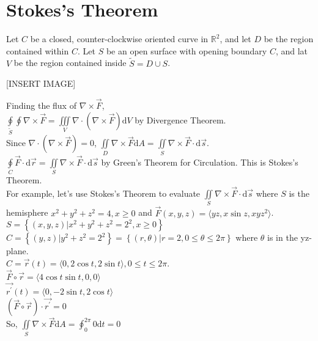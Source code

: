 \section{Stokes's Theorem}
\noindent
Let $C$ be a closed, counter-clockwise oriented curve in $\mathbb{R}^2$, and let $D$ be the region contained within $C$. Let $S$ be an open surface with opening boundary $C$, and lat $V$ be the region contained inside $\tilde{S}=D\cup S$.

[INSERT IMAGE]

\noindent
Finding the flux of $\nabla\times\vec{F}$,\\
$\oint\limits_{\tilde{S}}\oint{\nabla\times\vec{F}}=\iiint\limits_{V}{\nabla\cdot(\nabla\times\vec{F})\mathrm{d}V}$ by Divergence Theorem.\\
Since $\nabla\cdot(\nabla\times\vec{F})=0$, $\iint\limits_{D}{\nabla\times\vec{F}\mathrm{d}A}=\iint\limits_{S}{\nabla\times\vec{F}\cdot\mathrm{d}\vec{s}}$.\\
$\oint\limits_{C}{\vec{F}\cdot\mathrm{d}\vec{r}}=\iint\limits_{S}{\nabla\times\vec{F}\cdot\mathrm{d}\vec{s}}$ by Green's Theorem for Circulation. This is Stokes's Theorem.\\

\noindent
For example, let's use Stokes's Theorem to evaluate $\iint\limits_{S}{\nabla\times\vec{F}\cdot\mathrm{d}\vec{s}}$ where $S$ is the hemisphere $x^2+y^2+z^2=4, x\geq 0$ and $\vec{F}(x,y,z)=\langle yz, x\sin{z}, xyz^2\rangle$.\\
\indent
$S=\left\{(x,y,z)|x^2+y^2+z^2=2^2,x\geq 0\right\}$\\
\indent
$C=\left\{(y,z)|y^2+z^2=2^2\right\}=\left\{(r,\theta)|r=2,0\leq\theta\leq 2\pi\right\}$ where $\theta$ is in the yz-plane.\\
\indent
$C=\vec{r}(t)=\langle 0, 2\cos{t}, 2\sin{t}\rangle, 0\leq t\leq 2\pi$.\\
\indent
$\vec{F}\circ\vec{r}=\langle 4\cos{t}\sin{t}, 0, 0\rangle$\\
\indent
$\vec{r^\prime}(t)=\langle 0, -2\sin{t}, 2\cos{t}\rangle$\\
\indent
$\left(\vec{F}\circ\vec{r}\right)\cdot\vec{r^\prime}=0$\\
\indent
So, $\iint\limits_{S}{\nabla\times\vec{F}\mathrm{d}A}=\oint_{0}^{2\pi}{0\mathrm{d}t}=0$

